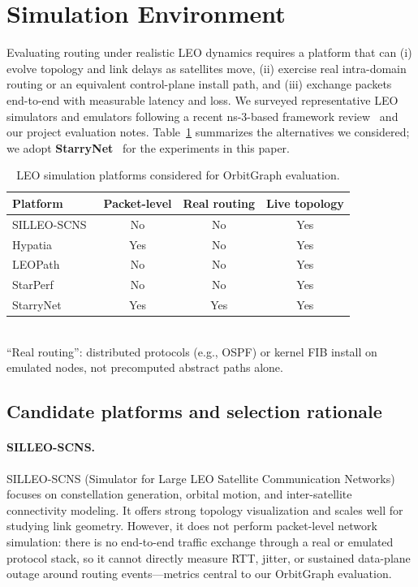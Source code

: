 
\section{Simulation Environment}
\label{sec:simulation}

Evaluating routing under realistic LEO dynamics requires a platform that can
(i) evolve topology and link delays as satellites move,
(ii) exercise real intra-domain routing or an equivalent control-plane install
path, and
(iii) exchange packets end-to-end with measurable latency and loss.
We surveyed representative LEO simulators and emulators following a recent
ns-3-based framework review~\cite{manzanareslopez2025comprehensive} and our
project evaluation notes.
Table~\ref{tab:simulators} summarizes the alternatives we considered; we adopt
\textbf{StarryNet}~\cite{lai2023starrynet} for the experiments in this paper.

\begin{table}[t]
  \centering
  \caption{LEO simulation platforms considered for OrbitGraph evaluation.}
  \label{tab:simulators}
  \renewcommand{\arraystretch}{1.15}
  \begin{tabular}{@{}lccc@{}}
    \hline
    Platform & Packet-level & Real routing & Live topology \\
    \hline
    SILLEO-SCNS~\cite{kempton2020silleo}      & No  & No  & Yes \\
    Hypatia~\cite{kassing2020exploring}       & Yes & No  & Yes \\
    LEOPath~\cite{leopath2024}                & No  & No  & Yes \\
    StarPerf~\cite{lai2020starperf}           & No  & No  & Yes \\
    StarryNet~\cite{lai2023starrynet}         & Yes & Yes & Yes \\
    \hline
  \end{tabular}
  \\[0.5em]
  \footnotesize
  ``Real routing'': distributed protocols (e.g., OSPF) or kernel FIB install on
  emulated nodes, not precomputed abstract paths alone.
\end{table}

\subsection{Candidate platforms and selection rationale}

\paragraph{SILLEO-SCNS.}
SILLEO-SCNS (Simulator for Large LEO Satellite Communication
Networks)~\cite{kempton2020silleo} focuses on constellation generation, orbital
motion, and inter-satellite connectivity modeling.
It offers strong topology visualization and scales well for studying link
geometry.
However, it does not perform packet-level network simulation: there is no
end-to-end traffic exchange through a real or emulated protocol stack, so it
cannot directly measure RTT, jitter, or sustained data-plane outage around
routing events---metrics central to our OrbitGraph evaluation.

